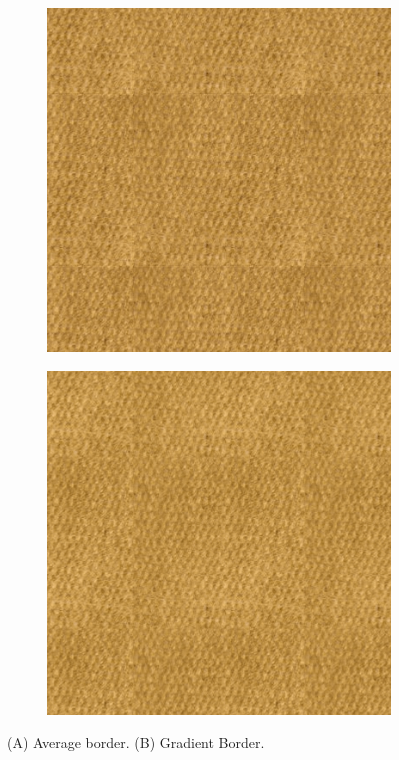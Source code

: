 \begin{figure}[!h]
    \centering
      \begin{subfigure}{0.40\textwidth}
        \includegraphics[width=\linewidth]{img/ch6/comparisons/tile_average-border-inr.png}
        \caption{}
      \end{subfigure}
      \begin{subfigure}{0.40\textwidth}
        \includegraphics[width=\linewidth]{img/ch6/comparisons/tile_gradient_border.png}
        \caption{}
      \end{subfigure}
    \caption{(A) Average border. (B) Gradient Border.} 
    \label{f:average_border}
\end{figure}

